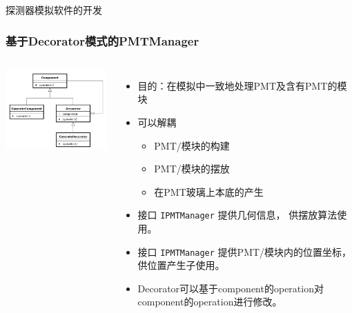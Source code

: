 \begin{frame}
    \begin{center}
        \Large 探测器模拟软件的开发
    \end{center}
\end{frame}

\begin{frame}
    \frametitle{基于Decorator模式的PMTManager}
    \begin{columns}
        \column{6.0cm}
        \includegraphics[width=6cm,keepaspectratio]{data/Decorator_UML_class_diagram.svg.png}
        \column{6.0cm}
        \begin{itemize}
            \item 目的：在模拟中一致地处理PMT及含有PMT的模块
            \item 可以解耦
                \begin{itemize}
                    \item PMT/模块的构建
                    \item PMT/模块的摆放
                    \item 在PMT玻璃上本底的产生
                \end{itemize}
            \item 接口 {\tt IPMTManager} 提供几何信息，
                  供摆放算法使用。
            \item 接口 {\tt IPMTManager} 提供PMT/模块内的位置坐标，
                  供位置产生子使用。
            \item Decorator可以基于component的operation对
                  component的operation进行修改。
        \end{itemize}
    \end{columns}
\end{frame}


